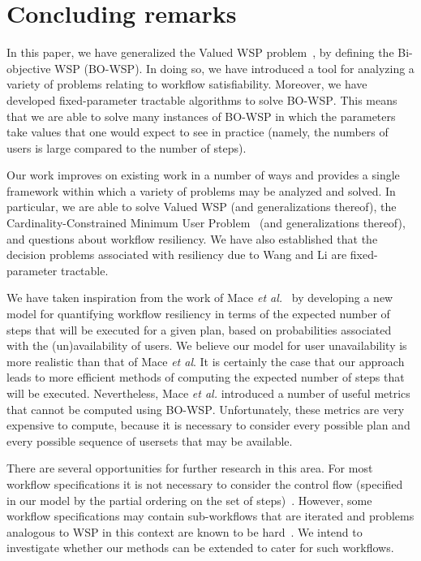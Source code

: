 \documentclass[jcs,crcready]{iosart1c}
\newcommand{\BOWSP}{\textsc{BO-WSP}\xspace}
\begin{document}
\section{Concluding remarks}\label{sec:conclusion}

In this paper, we have generalized the {\sc Valued WSP} problem~\cite{CrGuKa15}, by defining the {\sc Bi-objective WSP} (\BOWSP).
In doing so, we have introduced a tool for analyzing a variety of problems relating to workflow satisfiability.
Moreover, we have developed fixed-parameter tractable algorithms to solve \BOWSP.
This means that we are able to solve many instances of \BOWSP in which the parameters take values that one would expect to see in practice (namely, the numbers of users is large compared to the number of steps).

Our work improves on existing work in a number of ways and provides a single framework within which a variety of problems may be analyzed and solved.
In particular, we are able to solve {\sc Valued WSP} (and generalizations thereof), the Cardinality-Constrained Minimum User Problem~\cite{Roy2015} (and generalizations thereof), and questions about workflow resiliency.
We have also established that the decision problems associated with resiliency due to Wang and Li are fixed-parameter tractable.

We have taken inspiration from the work of Mace \emph{et al.}~\cite{MaMoMo14} by developing a new model for quantifying workflow resiliency in terms of the expected number of steps that will be executed for a given plan, based on probabilities associated with the (un)availability of users.
We believe our model for user unavailability is more realistic than that of Mace \emph{et al}.
It is certainly the case that our approach leads to more efficient methods of computing the expected number of steps that will be executed.
Nevertheless, Mace \emph{et al.} introduced a number of useful metrics that cannot be computed using \BOWSP.
Unfortunately,  these metrics are very expensive to compute, because it is necessary to consider every possible plan and every possible sequence of usersets that may be available.


There are several opportunities for further research in this area.
For most workflow specifications it is not necessary to consider the control flow (specified in our model by the partial ordering on the set of steps)~\cite{CrGu13}.
However, some workflow specifications may contain sub-workflows that are iterated and problems analogous to WSP in this context are known to be hard~\cite{BaBuKa12}.
We intend to investigate whether our methods can be extended to cater for such workflows.
\end{document}
